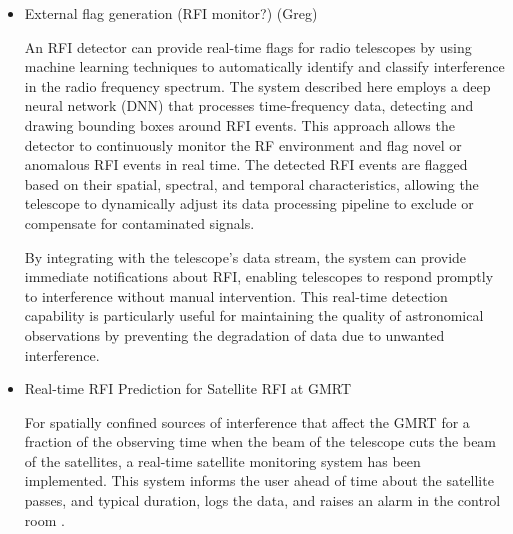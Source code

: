 \begin{itemize}
\item External flag generation (RFI monitor?) (Greg)

An RFI detector can provide real-time flags for radio telescopes by using machine learning techniques to automatically identify and classify interference in the radio frequency spectrum. The system described here \cite{9111666} employs a deep neural network (DNN) that processes time-frequency data, detecting and drawing bounding boxes around RFI events. This approach allows the detector to continuously monitor the RF environment and flag novel or anomalous RFI events in real time. The detected RFI events are flagged based on their spatial, spectral, and temporal characteristics, allowing the telescope to dynamically adjust its data processing pipeline to exclude or compensate for contaminated signals.

By integrating with the telescope’s data stream, the system can provide immediate notifications about RFI, enabling telescopes to respond promptly to interference without manual intervention. This real-time detection capability is particularly useful for maintaining the quality of astronomical observations by preventing the degradation of data due to unwanted interference.

\item Real-time RFI Prediction for Satellite RFI at GMRT

For spatially confined sources of interference that affect the GMRT for a fraction of the observing time when the beam of the telescope cuts the beam of the satellites, a real-time satellite monitoring system has been implemented. This system informs the user ahead of time about the satellite passes, and typical duration, logs the data, and raises an alarm in the control room \cite{raybole2016real}.



\end{itemize}